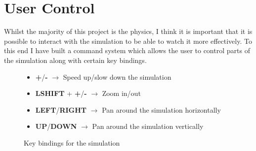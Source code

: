 \section{User Control}
	
	Whilst the majority of this project is the physics, I think it is important that it is possible to interact with the simulation to be able to watch it more effectively. To this end I have built a command system which allows the user to control parts of the simulation along with certain key bindings.
	
	\begin{figure}[h]
		\begin{itemize}
			\item \textbf{+}/\textbf{-} $\rightarrow$ Speed up/slow down the simulation
			\item \textbf{LSHIFT} + \textbf{+}/\textbf{-} $\rightarrow$ Zoom in/out
			\item \textbf{LEFT}/\textbf{RIGHT} $\rightarrow$ Pan around the simulation horizontally
			\item \textbf{UP}/\textbf{DOWN} $\rightarrow$ Pan around the simulation vertically
		\end{itemize}
		\caption{Key bindings for the simulation}
		\label{fig:keybindings}
	\end{figure}
	

